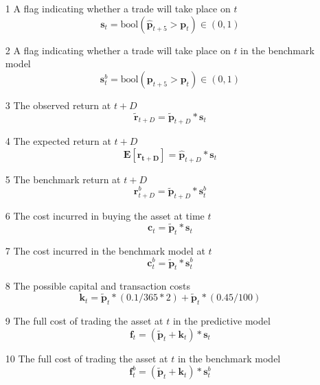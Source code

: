 \documentclass[a4paper,11pt,oneside]{article}
\theoremstyle{plain}
\theoremstyle{definition}
\begin{document}
	\begin{itemize}
		\item [1] A flag indicating whether a trade will take place on $t$
		\begin{equation}
		\mathbf{s}_t = \mathrm{bool}(\mathbf{\hat{p}}_{t+5} > \mathbf{p}_t) \in (0, 1)
		\end{equation}
		\item [2] A flag indicating whether a trade will take place on $t$ in the benchmark model
		\begin{equation}
		\mathbf{s}^b_{t} = \mathrm{bool}({\mathbf{p}}_{t+5} > \mathbf{p}_t) \in (0, 1)
		\end{equation}
		\item [3] The observed return at $t+D$
		\begin{equation}
		\mathbf{\tilde{r}}_{t + D} = \mathbf{\tilde{p}}_{t+D} * \mathbf{s}_t
		\end{equation}	
		\item [4] The expected return at $t+D$
		\begin{equation}
		\mathbf{E[r_{t + D}]} = \mathbf{\hat{p}}_{t+D} * \mathbf{s}_t
		\end{equation}
		\item [5] The benchmark return at $t+D$
		\begin{equation}
		\mathbf{r}^b_{t + D} = \mathbf{\tilde{p}}_{t+D} * \mathbf{s}^b_{t}
		\end{equation}
		
		
		
		\item [6] The cost incurred in buying the asset at time $t$
		\begin{equation}
		\mathbf{c}_t = \mathbf{\tilde{p}}_t * \mathbf{s}_t
		\end{equation}
		\item [7] The cost incurred in the benchmark model at $t$
		\begin{equation}
		\mathbf{c}^b_{t} = \mathbf{\tilde{p}}_t * \mathbf{s}^b_{t}
		\end{equation}
		\item [8] The possible capital and transaction costs
		\begin{equation}
		\mathbf{k}_t= \mathbf{\tilde{p}}_t * (0.1 / 365 * 2) + \mathbf{\tilde{p}}_t * (0.45 / 100)
		\end{equation}
		\item [9] The full cost of trading the asset at $t$ in the predictive model
		\begin{equation}
		\mathbf{f}_t = (\mathbf{\tilde{p}}_t + \mathbf{k}_t) * \mathbf{s}_t
		\end{equation}	
		\item [10] The full cost of trading the asset at $t$ in the benchmark model
		\begin{equation}
		\mathbf{f}^b_{t} = (\mathbf{\tilde{p}}_t + \mathbf{k}_t) * \mathbf{s}^b_{t}
		\end{equation}
	\end{itemize}
	
\end{document}

